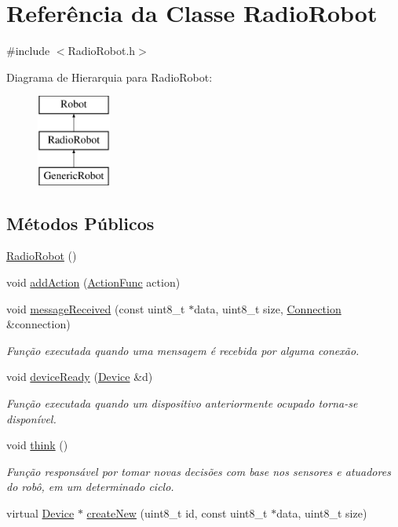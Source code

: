 \hypertarget{classRadioRobot}{\section{Referência da Classe Radio\-Robot}
\label{classRadioRobot}
}


{\ttfamily \#include $<$Radio\-Robot.\-h$>$}

Diagrama de Hierarquia para Radio\-Robot\-:\begin{figure}[H]
\begin{center}
\leavevmode
\includegraphics[height=3.000000cm]{classRadioRobot}
\end{center}
\end{figure}
\subsection*{Métodos Públicos}
\begin{DoxyCompactItemize}
\item 
\hyperlink{classRadioRobot_ad28a59e73e546d15004efda03525c143}{Radio\-Robot} ()
\item 
void \hyperlink{classRadioRobot_a1470b91c7a534545bdc6126c3065d4b8}{add\-Action} (\hyperlink{RadioRobot_8h_a3541f6ba20932adb767c7e0d8bdc6940}{Action\-Func} action)
\item 
void \hyperlink{classRadioRobot_a5de90c99faa941df35898349b6b148b5}{message\-Received} (const uint8\-\_\-t $\ast$data, uint8\-\_\-t size, \hyperlink{classConnection}{Connection} \&connection)
\begin{DoxyCompactList}\small\item\em Função executada quando uma mensagem é recebida por alguma conexão. \end{DoxyCompactList}\item 
void \hyperlink{classRadioRobot_a278b37c78b4fd9c4d7b16192e780f6a1}{device\-Ready} (\hyperlink{classDevice}{Device} \&d)
\begin{DoxyCompactList}\small\item\em Função executada quando um dispositivo anteriormente ocupado torna-\/se disponível. \end{DoxyCompactList}\item 
void \hyperlink{classRadioRobot_a7b58f55a81e816ba5d53fd14bf28a6a5}{think} ()
\begin{DoxyCompactList}\small\item\em Função responsável por tomar novas decisões com base nos sensores e atuadores do robô, em um determinado ciclo. \end{DoxyCompactList}\item 
virtual \hyperlink{classDevice}{Device} $\ast$ \hyperlink{classRadioRobot_ae52a4b2243df9d55238cfaa7be2e302d}{create\-New} (uint8\-\_\-t id, const uint8\-\_\-t $\ast$data, uint8\-\_\-t size)
\end{DoxyCompactItemize}

